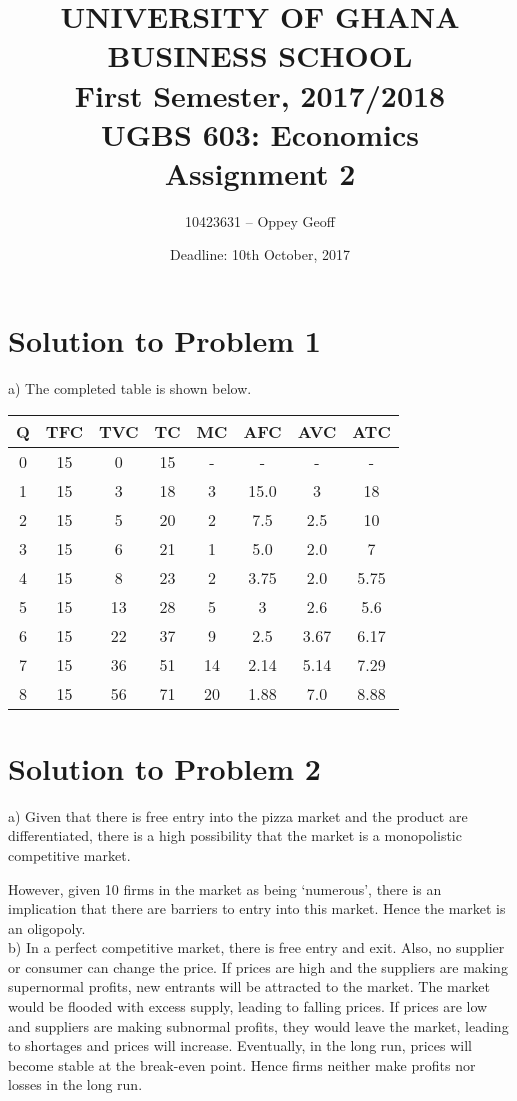 \documentclass[12pt]{article}
\title{\textbf{UNIVERSITY OF GHANA BUSINESS SCHOOL\\ \vspace{0.5cm}
	First Semester, 2017/2018\\ %
	UGBS 603: Economics\\
	Assignment 2}}
\date{Deadline: 10th October, 2017}
\author{10423631 -- Oppey Geoff}
\begin{document}
\maketitle
\clearpage

\section*{Solution to Problem 1}

a) The completed table is shown below.\\
\begin{center}
	\begin{tabular}{|c|c|c|c|c|c|c|c|}
		\hline
		Q	& TFC  & TVC  & TC   & MC   & AFC   & AVC   & ATC \\ 
		\hline
		0	& 15   & 0    & 15   & -    & -     & -     & -    \\ 
		1	& 15   & 3    & 18   & 3    & 15.0  & 3     & 18   \\ 
		2	& 15   & 5    & 20   & 2    & 7.5   & 2.5   & 10   \\ 
		3	& 15   & 6    & 21   & 1    & 5.0   & 2.0   & 7    \\ 
		4	& 15   & 8    & 23   & 2    & 3.75  & 2.0   & 5.75 \\ 
		5	& 15   & 13   & 28   & 5    & 3     & 2.6   & 5.6  \\
		6	& 15   & 22   & 37   & 9    & 2.5   & 3.67  & 6.17 \\
		7	& 15   & 36   & 51   & 14   & 2.14  & 5.14  & 7.29 \\
		8	& 15   & 56   & 71   & 20   & 1.88  & 7.0   & 8.88 \\
		\hline
	\end{tabular}
\end{center}
	\clearpage

\section*{Solution to Problem 2}
a) Given that there is free entry into the pizza market and the product are differentiated, there is a high possibility that the market is a monopolistic competitive market.

However, given 10 firms in the market as being `numerous', there is an implication that there are barriers to entry into this market. Hence the market is an oligopoly.\\


b) In a perfect competitive market, there is free entry and exit. Also, no supplier or consumer can change the price. If prices are high and the suppliers are making supernormal profits, new entrants will be attracted to the market. The market would be flooded with excess supply, leading to falling prices. If prices are low and suppliers are making subnormal profits, they would leave the market, leading to shortages and prices will increase. Eventually, in the long run, prices will become stable at the break-even point. Hence firms neither make profits nor losses in the long run.\\
\end{document}
